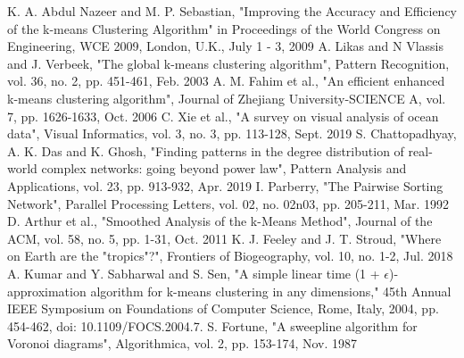 \documentclass[conference,compsoc]{IEEEtran}
\begin{document}
\begin{thebibliography}{00}
 K. A. Abdul Nazeer and M. P. Sebastian, "Improving the Accuracy and Efficiency of the k-means Clustering Algorithm" in Proceedings of the World Congress on Engineering, WCE 2009, London, U.K., July 1 - 3, 2009
 A. Likas and N Vlassis and J. Verbeek, "The global k-means clustering algorithm", Pattern Recognition, vol. 36, no. 2, pp. 451-461, Feb. 2003
 A. M. Fahim et al., "An efficient enhanced k-means clustering algorithm", Journal of Zhejiang University-SCIENCE A, vol. 7, pp. 1626-1633, Oct. 2006
 C. Xie et al., "A survey on visual analysis of ocean data", Visual Informatics, vol. 3, no. 3, pp. 113-128, Sept. 2019
 S. Chattopadhyay, A. K. Das and K. Ghosh, "Finding patterns in the degree distribution of real-world complex networks: going beyond power law", Pattern Analysis and Applications, vol. 23, pp. 913-932, Apr. 2019
 I. Parberry, "The Pairwise Sorting Network", Parallel Processing Letters, vol. 02, no. 02n03, pp. 205-211, Mar. 1992
 D. Arthur et al., "Smoothed Analysis of the k-Means Method", Journal of the ACM, vol. 58, no. 5, pp. 1-31, Oct. 2011
 K. J. Feeley and J. T. Stroud, "Where on Earth are the "tropics"?", Frontiers of Biogeography, vol. 10, no. 1-2, Jul. 2018
 A. Kumar and Y. Sabharwal and S. Sen, "A simple linear time (1 + $\epsilon$)-approximation algorithm for k-means clustering in any dimensions," 45th Annual IEEE Symposium on Foundations of Computer Science, Rome, Italy, 2004, pp. 454-462, doi: 10.1109/FOCS.2004.7.
 S. Fortune, "A sweepline algorithm for Voronoi diagrams", Algorithmica, vol. 2, pp. 153-174, Nov. 1987
\end{thebibliography}
\end{document}
